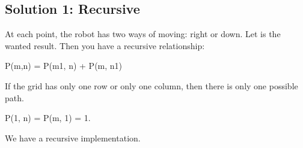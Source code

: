 \documentclass[letterpaper,12pt,english]{book}
\begin{document}
\subsection{Solution 1: Recursive}
\label{\detokenize{Dynamic_Programming/05_DP_62_Unique_Paths:solution-1-recursive}}
\sphinxAtStartPar
At each point, the robot has two ways of moving: right or down. Let  is the wanted result. Then you have a recursive relationship:

\begin{sphinxVerbatim}[commandchars=\\\{\}]
P(m,n) = P(m\PYGZhy{}1, n) + P(m, n\PYGZhy{}1)
\end{sphinxVerbatim}

\sphinxAtStartPar
If the grid has only one row or only one column, then there is only one possible path.

\begin{sphinxVerbatim}[commandchars=\\\{\}]
P(1, n) = P(m, 1) = 1.
\end{sphinxVerbatim}

\sphinxAtStartPar
We have a recursive implementation.
\end{document}
